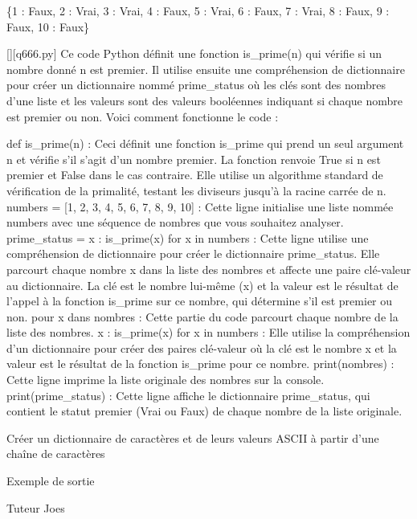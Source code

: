 \{1 : Faux, 2 : Vrai, 3 : Vrai, 4 : Faux, 5 : Vrai, 6 : Faux, 7 : Vrai, 8 : Faux, 9 : Faux, 10 : Faux\}
        \par
        \begin{solution}
            \renewcommand{\nomfichier}{q666.py}
            \pythonfile{\chemincode \nomfichier}[][\nomfichier]
            Ce code Python définit une fonction is_prime(n) qui vérifie si un nombre donné n est premier. Il utilise ensuite une compréhension de dictionnaire pour créer un dictionnaire nommé prime_status où les clés sont des nombres d'une liste et les valeurs sont des valeurs booléennes indiquant si chaque nombre est premier ou non. Voici comment fonctionne le code :

    def is_prime(n) : Ceci définit une fonction is_prime qui prend un seul argument n et vérifie s'il s'agit d'un nombre premier. La fonction renvoie True si n est premier et False dans le cas contraire. Elle utilise un algorithme standard de vérification de la primalité, testant les diviseurs jusqu'à la racine carrée de n.
    numbers = [1, 2, 3, 4, 5, 6, 7, 8, 9, 10] : Cette ligne initialise une liste nommée numbers avec une séquence de nombres que vous souhaitez analyser.
    prime_status = {x : is_prime(x) for x in numbers} : Cette ligne utilise une compréhension de dictionnaire pour créer le dictionnaire prime_status. Elle parcourt chaque nombre x dans la liste des nombres et affecte une paire clé-valeur au dictionnaire. La clé est le nombre lui-même (x) et la valeur est le résultat de l'appel à la fonction is_prime sur ce nombre, qui détermine s'il est premier ou non.
        pour x dans nombres : Cette partie du code parcourt chaque nombre de la liste des nombres.
        {x : is_prime(x) for x in numbers} : Elle utilise la compréhension d'un dictionnaire pour créer des paires clé-valeur où la clé est le nombre x et la valeur est le résultat de la fonction is_prime pour ce nombre.
    print(nombres) : Cette ligne imprime la liste originale des nombres sur la console.
    print(prime_status) : Cette ligne affiche le dictionnaire prime_status, qui contient le statut premier (Vrai ou Faux) de chaque nombre de la liste originale.
        \end{solution}
        

        \question
        Créer un dictionnaire de caractères et de leurs valeurs ASCII à partir d'une chaîne de caractères

Exemple de sortie

Tuteur Joes

